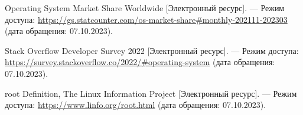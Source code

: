 \begin{thebibliography}{}
	Operating System Market Share Worldwide [Электронный ресурс]. --- Режим доступа: \url{https://gs.statcounter.com/os-market-share#monthly-202111-202303} (дата обращения: 07.10.2023).
	
	Stack Overflow Developer Survey 2022 [Электронный ресурс]. --- Режим доступа: \url{https://survey.stackoverflow.co/2022/#operating-system} (дата обращения: 07.10.2023).

	root Definition, The Linux Information Project [Электронный ресурс]. --- Режим доступа: \url{https://www.linfo.org/root.html} (дата обращения: 07.10.2023).
	
%	
%	
%	
%	
%	
%	
%
%	
%
%	
%	

\end{thebibliography}
